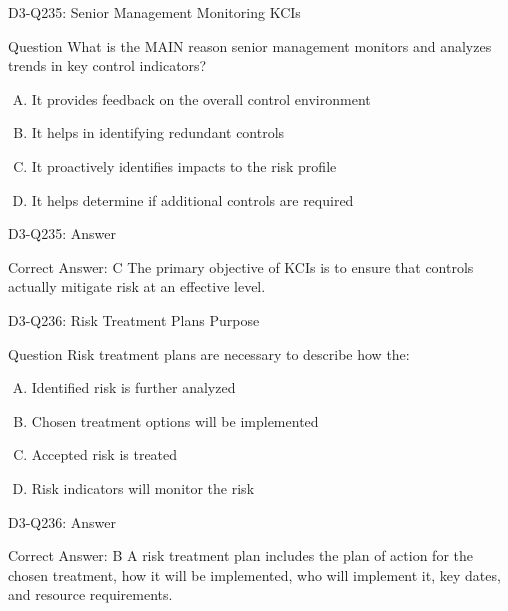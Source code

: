 \documentclass{beamer}
\begin{document}
	\begin{frame}{D3-Q235: Senior Management Monitoring KCIs}
		\begin{block}{Question}
			What is the MAIN reason senior management monitors and analyzes trends in key control indicators?
		\end{block}
		\begin{enumerate}[(A)]
			\item It provides feedback on the overall control environment
			\item It helps in identifying redundant controls
			\item It proactively identifies impacts to the risk profile
			\item It helps determine if additional controls are required
		\end{enumerate}
	\end{frame}
	\begin{frame}{D3-Q235: Answer}
		\begin{block}{Correct Answer: C}
			The primary objective of KCIs is to ensure that controls actually mitigate risk at an effective level.
		\end{block}
	\end{frame}
	
	\begin{frame}{D3-Q236: Risk Treatment Plans Purpose}
		\begin{block}{Question}
			Risk treatment plans are necessary to describe how the:
		\end{block}
		\begin{enumerate}[(A)]
			\item Identified risk is further analyzed
			\item Chosen treatment options will be implemented
			\item Accepted risk is treated
			\item Risk indicators will monitor the risk
		\end{enumerate}
	\end{frame}
	\begin{frame}{D3-Q236: Answer}
		\begin{block}{Correct Answer: B}
			A risk treatment plan includes the plan of action for the chosen treatment, how it will be implemented, who will implement it, key dates, and resource requirements.
		\end{block}
	\end{frame}
	
\end{document}
